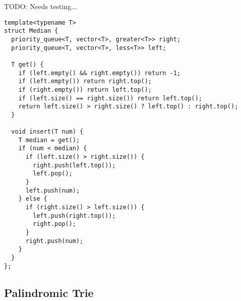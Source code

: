 TODO: Needs testing...

\begin{lstlisting}
template<typename T>
struct Median {
  priority_queue<T, vector<T>, greater<T>> right;
  priority_queue<T, vector<T>, less<T>> left;
  
  T get() {
    if (left.empty() && right.empty()) return -1;
    if (left.empty()) return right.top();
    if (right.empty()) return left.top();
    if (left.size() == right.size()) return left.top();
    return left.size() > right.size() ? left.top() : right.top();
  }

  void insert(T num) {
    T median = get();
    if (num < median) {
      if (left.size() > right.size()) {
        right.push(left.top());
        left.pop();
      }
      left.push(num);
    } else {
      if (right.size() > left.size()) {
        left.push(right.top());
        right.pop();
      }
      right.push(num);
    }
  }
};

\end{lstlisting}

\newpage

\subsection{Palindromic Trie}

